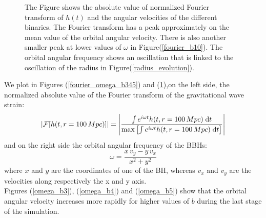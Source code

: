 \begin{figure}[]
   \quad

  \quad
{}
   
   
\caption{The Figure shows the absolute  value of normalized Fourier transform of $h(t)$ and the angular velocities of the different binaries. The Fourier transform has a peak approximately on the mean value of the orbital angular velocity. There is also another smaller peak at lower values of $\omega$ in Figure(\ref{fourier_b10}). The orbital angular frequency shows an oscillation that is linked to the oscillation of the radius in Figure(\ref{radius_evolution}).}
\label{fourier_omega_b6710}

\end{figure}
We plot in Figures (\ref{fourier_omega_b345}) and (\ref{fourier_omega_b6710}),on the left side, the normalized absolute value of the Fourier transform of the gravitational wave strain:
\[
\abs{\mathcal{F}[h(t,r=100 \, Mpc)]} = \abs{
\dfrac{\int e^{i \omega t}  h(t,r=100 \, Mpc) \;\dd t }{\max \qty[\int e^{i \omega t}  h(t,r=100 \, Mpc) \;\dd t] }
}
\]
and on the right side the orbital angular frequency of the BBHs:
\[
\omega = \dfrac{x \, v_y - y \,v_x}{x^{2}+y^{2}}
\]
where $x$ and $y$ are the coordinates of one of the BH, whereas $v_x$ and $v_y$ are the velocities along respectively the x and y axis.\\
Figures (\ref{omega_b3}), (\ref{omega_b4}) and (\ref{omega_b5}) show that the orbital angular velocity increases more rapidly for higher values of $b$ during the last stage of the simulation. 
